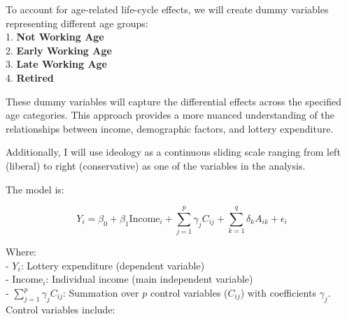 \documentclass[
  12pt]{article}
\begin{document}
To account for age-related life-cycle effects, we will create dummy
variables representing different age groups:\\
1. \textbf{Not Working Age}\\
2. \textbf{Early Working Age}\\
3. \textbf{Late Working Age}\\
4. \textbf{Retired}

These dummy variables will capture the differential effects across the
specified age categories. This approach provides a more nuanced
understanding of the relationships between income, demographic factors,
and lottery expenditure.

Additionally, I will use ideology as a continuous sliding scale ranging
from left (liberal) to right (conservative) as one of the variables in
the analysis.

The model is:

\[
Y_i = \beta_0 + \beta_1 \text{Income}_i + \sum_{j=1}^{p} \gamma_{j} C_{ij} + \sum_{k=1}^{q} \delta_k A_{ik} + \epsilon_i
\]

Where:\\
- \(Y_i\): Lottery expenditure (dependent variable)\\
- \(\text{Income}_i\): Individual income (main independent variable)\\
- \(\sum_{j=1}^{p} \gamma_j C_{ij}\): Summation over \(p\) control
variables (\(C_{ij}\)) with coefficients \(\gamma_j\). Control variables
include:
\end{document}
